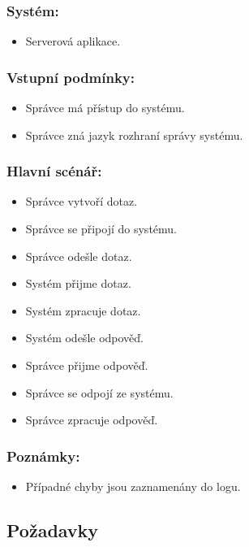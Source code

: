 \subsubsection*{Systém:}
\begin{itemize}
 \item Serverová aplikace.
\end{itemize}
\subsubsection*{Vstupní podmínky:}
\begin{itemize}
 \item Správce má přístup do systému.
 \item Správce zná jazyk rozhraní správy systému.
\end{itemize}
\subsubsection*{Hlavní scénář:}
\begin{itemize}
 \item Správce vytvoří dotaz.
 \item Správce se připojí do systému.
 \item Správce odešle dotaz.
 \item Systém přijme dotaz.
 \item Systém zpracuje dotaz.
 \item Systém odešle odpověď.
 \item Správce přijme odpověď.
 \item Správce se odpojí ze systému.
 \item Správce zpracuje odpověď.
\end{itemize}
\subsubsection*{Poznámky:}
\begin{itemize}
 \item Případné chyby jsou zaznamenány do logu.
\end{itemize}


\subsection{Požadavky}
